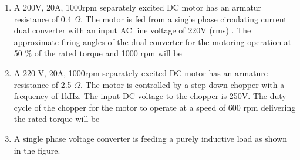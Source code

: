 \documentclass[journal,12pt,onecolumn]{IEEEtran}
\theoremstyle{remark}
\begin{document}
\begin{enumerate}
\begin{enumerate}
			\item
					\begin{figure}[H]
			\centering
			
			\caption{}
			\label{25}
		\end{figure}

		\end{enumerate}
	\item A 200V, 20A, 1000rpm separately excited DC motor has an armatur resistance of 0.4 $\Omega$. The motor is fed from a single phase circulating current dual converter with an input AC line voltage of 220V (rms) . The approximate firing angles of the dual converter for the motoring operation at 50 $\%$ of the rated torque and 1000 rpm will be
		\begin{enumerate}
		\end{enumerate}
	\item A 220 V, 20A, 1000rpm separately excited DC motor has an armature resistance of 2.5 $\Omega$. The motor is controlled by a step-down chopper with a frequency of 1kHz. The input DC voltage to the chopper is 250V. The duty cycle of the chopper for the motor to operate at a speed of 600 rpm delivering the rated torque will be
		\begin{enumerate}
				\begin{multicols}{4}
				\item 0.518
				\item 0.608
				\item 0.852
				\item 0.902
				\end{multicols}
		\end{enumerate}
	\item A single phase voltage converter is feeding a purely inductive load as shown in the figure.
			\begin{figure}[H]
			\centering
			
			\caption{}
			\label{25}
		\end{figure}


\end{enumerate}
\end{document}
